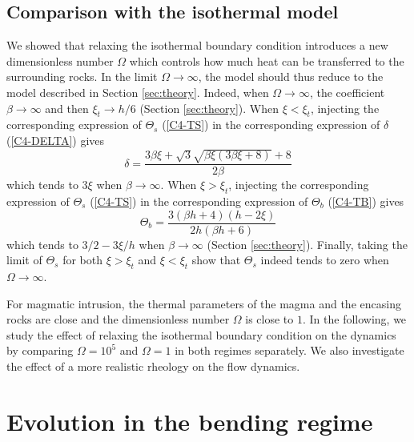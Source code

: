 \subsection{Comparison with the isothermal model}
\label{sec:some-limits}

We showed that relaxing the isothermal boundary condition introduces a
new dimensionless number $\Omega$ which  controls how much heat can be
transferred    to   the    surrounding    rocks.     In   the    limit
$\Omega \rightarrow \infty$, the model should thus reduce to the model
described     in    Section     \ref{sec:theory}.     Indeed,     when
$\Omega\rightarrow \infty$, the  coefficient $\beta\rightarrow \infty$
and  then  $\xi_t\rightarrow  h/6$ (Section  \ref{sec:theory}).   When
$\xi<\xi_t$,  injecting  the  corresponding expression  of  $\Theta_s$
(\ref{C4-TS})   in   the    corresponding   expression   of   $\delta$
(\ref{C4-DELTA}) gives
\begin{equation}
  \delta =\frac{3 \beta \xi +\sqrt{3} \sqrt{\beta \xi (3 \beta \xi +8)}+8}{2 \beta }
\end{equation}
which  tends   to  $3\xi$  when  $\beta   \rightarrow  \infty$.   When
$\xi>\xi_t$,  injecting  the  corresponding expression  of  $\Theta_s$
(\ref{C4-TS})   in   the   corresponding  expression   of   $\Theta_b$
(\ref{C4-TB}) gives
\begin{equation}
  \Theta_b = \frac{3 (\beta  h+4) (h-2 \xi )}{2 h (\beta  h+6)}
\end{equation}
which tends  to $3/2-3\xi/h$ when $\beta  \rightarrow \infty$ (Section
\ref{sec:theory}). Finally,  taking the  limit of $\Theta_s$  for both
$\xi>\xi_t$ and $\xi<\xi_t$ show that  $\Theta_s$ indeed tends to zero
when $\Omega\rightarrow \infty$.

For magmatic  intrusion, the thermal  parameters of the magma  and the
encasing  rocks are  close and  the dimensionless  number $\Omega$  is
close to  $1$. In the following,  we study the effect  of relaxing the
isothermal   boundary  condition   on   the   dynamics  by   comparing
$\Omega=10^5$ and  $\Omega = 1$  in both regimes separately.   We also
investigate  the effect  of  a  more realistic  rheology  on the  flow
dynamics. 

\section{Evolution in the bending regime}
\label{sec:evol-bend-regime-1}

